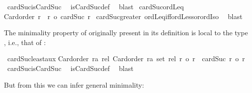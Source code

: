 \begin{isabellebody}
%
\isatagproof
{}\isamarkupfalse%
\ cardSuc{\isacharunderscore}{\kern0pt}isCardSuc\ \isamarkupfalse%
\ isCardSuc{\isacharunderscore}{\kern0pt}def\ \isamarkupfalse%
\ blast%
\endisatagproof
{\isafoldproof}%
%
\isadelimproof
\isanewline
%
\endisadelimproof
\isanewline
{}\isamarkupfalse%
\ cardSuc{\isacharunderscore}{\kern0pt}ordLeq{\isacharcolon}{\kern0pt}\isanewline
{\isachardoublequoteopen}Card{\isacharunderscore}{\kern0pt}order\ r\ {\isasymLongrightarrow}\ r\ {\isasymle}o\ cardSuc\ r{\isachardoublequoteclose}\isanewline
%
\isadelimproof
%
\endisadelimproof
%
\isatagproof
{}\isamarkupfalse%
\ cardSuc{\isacharunderscore}{\kern0pt}greater\ ordLeq{\isacharunderscore}{\kern0pt}iff{\isacharunderscore}{\kern0pt}ordLess{\isacharunderscore}{\kern0pt}or{\isacharunderscore}{\kern0pt}ordIso\ \isamarkupfalse%
\ blast%
\endisatagproof
{\isafoldproof}%
%
\isadelimproof
%
\endisadelimproof
%
\begin{isamarkuptext}%
The minimality property of  originally present in its definition
is local to the type , i.e., that of :%
\end{isamarkuptext}\isamarkuptrue%
\isamarkupfalse%
\ cardSuc{\isacharunderscore}{\kern0pt}least{\isacharunderscore}{\kern0pt}aux{\isacharcolon}{\kern0pt}\isanewline
{\isachardoublequoteopen}{\isasymlbrakk}Card{\isacharunderscore}{\kern0pt}order\ {\isacharparenleft}{\kern0pt}r{\isacharcolon}{\kern0pt}{\isacharcolon}{\kern0pt}{\isacharprime}{\kern0pt}a\ rel{\isacharparenright}{\kern0pt}{\isacharsemicolon}{\kern0pt}\ Card{\isacharunderscore}{\kern0pt}order\ {\isacharparenleft}{\kern0pt}r{\isacharprime}{\kern0pt}{\isacharcolon}{\kern0pt}{\isacharcolon}{\kern0pt}{\isacharprime}{\kern0pt}a\ set\ rel{\isacharparenright}{\kern0pt}{\isacharsemicolon}{\kern0pt}\ r\ {\isacharless}{\kern0pt}o\ r{\isacharprime}{\kern0pt}{\isasymrbrakk}\ {\isasymLongrightarrow}\ cardSuc\ r\ {\isasymle}o\ r{\isacharprime}{\kern0pt}{\isachardoublequoteclose}\isanewline
%
\isadelimproof
%
\endisadelimproof
%
\isatagproof
{}\isamarkupfalse%
\ cardSuc{\isacharunderscore}{\kern0pt}isCardSuc\ \isamarkupfalse%
\ isCardSuc{\isacharunderscore}{\kern0pt}def\ \isamarkupfalse%
\ blast%
\endisatagproof
{\isafoldproof}%
%
\isadelimproof
%
\endisadelimproof
%
\begin{isamarkuptext}%
But from this we can infer general minimality:%
\end{isamarkuptext}\isamarkuptrue%

\end{isabellebody}
